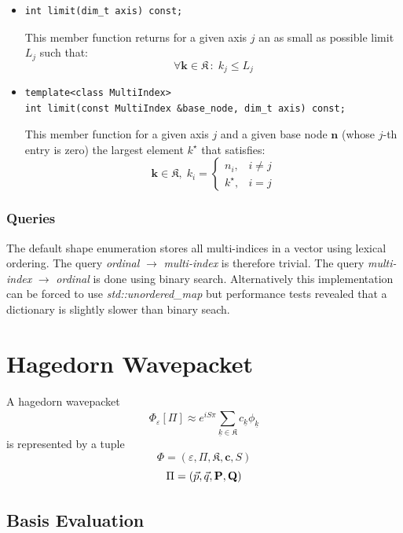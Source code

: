 \documentclass{article}
\begin{document}
\begin{itemize}
\item
\begin{verbatim}
int limit(dim_t axis) const;
\end{verbatim}
  This member function returns for a given axis \( j \)
  an as small as possible limit \( L_j \) such that:
  \[ \forall \boldsymbol{k} \in \mathfrak{K} \,\colon\; k_j \leq
    L_j \]

\item
\begin{verbatim}
template<class MultiIndex>
int limit(const MultiIndex &base_node, dim_t axis) const;
\end{verbatim}
  This member function for a given axis \( j \)
  and a given base node \( \boldsymbol{n} \)
  (whose \( j \)-th
  entry is zero) the largest element \( k^\star \) that satisfies:
  \[ \boldsymbol{k} \in \mathfrak{K}, \; k_i =
    \begin{cases}
      n_i,& i \neq j\\
      k^\star, & i = j
    \end{cases}
  \]

\end{itemize}

\subsubsection{Queries}
The default shape enumeration stores all multi-indices in a vector
using lexical ordering. The query \emph{ordinal} \(\rightarrow\)
\emph{multi-index} is therefore trivial. The query \emph{multi-index}
\(\rightarrow\)
\emph{ordinal} is done using binary search. Alternatively this
implementation can be forced to use \emph{std::unordered\_map} but
performance tests revealed that a dictionary is slightly slower than
binary seach.

\section{Hagedorn Wavepacket}
A hagedorn wavepacket
\[
  \Phi_{\varepsilon}[\Pi] \approx e^{iS\pi} \sum_{\underline{k} \in
    \mathfrak{K}}^{} c_{\underline{k}} \phi_{\underline{k}} \]
is represented by a tuple
\[ \Phi = \left( \varepsilon, \Pi, \mathfrak{K}, \boldsymbol{c}, S
  \right) \]
\[ \Pi = \left( \vec{p}, \vec{q}, \mathbf{P}, \mathbf{Q} \right) \]

\subsection{Basis Evaluation}
\end{document}
